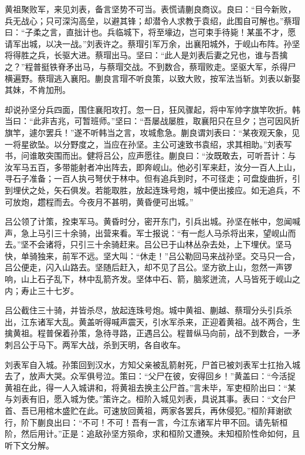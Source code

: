 黄祖聚败军，来见刘表，备言坚势不可当。表慌请蒯良商议。良曰：“目今新败，兵无战心；只可深沟高垒，以避其锋；却潜令人求教于袁绍，此围自可解也。”蔡瑁曰：“子柔之言，直拙计也。兵临城下，将至壕边，岂可束手待毙！某虽不才，愿请军出城，以决一战。”刘表许之。蔡瑁引军万余，出襄阳城外，于岘山布阵。孙坚将得胜之兵，长驱大进。蔡瑁出马。坚曰：“此人是刘表后妻之兄也，谁与吾擒之？”程普挺铁脊矛出马，与蔡瑁交战。不到数合，蔡瑁败走。坚驱大军，杀得尸横遍野。蔡瑁逃入襄阳。蒯良言瑁不听良策，以致大败，按军法当斩。刘表以新娶其妹，不肯加刑。

却说孙坚分兵四面，围住襄阳攻打。忽一日，狂风骤起，将中军帅字旗竿吹折。韩当曰：“此非吉兆，可暂班师。”坚曰：“吾屡战屡胜，取襄阳只在旦夕；岂可因风折旗竿，遽尔罢兵！”遂不听韩当之言，攻城愈急。蒯良谓刘表曰：“某夜观天象，见一将星欲坠。以分野度之，当应在孙坚。主公可速致书袁绍，求其相助。”刘表写书，问谁敢突围而出。健将吕公，应声愿往。蒯良曰：“汝既敢去，可听吾计：与汝军马五百，多带能射者冲出阵去，即奔岘山。他必引军来赶，汝分一百人上山，寻石子准备；一百人执弓弩伏于林中。但有追兵到时，不可径走；可盘旋曲折，引到埋伏之处，矢石俱发。若能取胜，放起连珠号炮，城中便出接应。如无追兵，不可放炮，趱程而去。今夜月不甚明，黄昏便可出城。”

吕公领了计策，拴束军马。黄昏时分，密开东门，引兵出城。孙坚在帐中，忽闻喊声，急上马引三十余骑，出营来看。军士报说：“有一彪人马杀将出来，望岘山而去。”坚不会诸将，只引三十余骑赶来。吕公已于山林丛杂去处，上下埋伏。坚马快，单骑独来，前军不远。坚大叫：“休走！”吕公勒回马来战孙坚。交马只一合，吕公便走，闪入山路去。坚随后赶入，却不见了吕公。坚方欲上山，忽然一声锣响，山上石子乱下，林中乱箭齐发。坚体中石、箭，脑浆迸流，人马皆死于岘山之内；寿止三十七岁。

吕公截住三十骑，并皆杀尽，放起连珠号炮。城中黄祖、蒯越、蔡瑁分头引兵杀出，江东诸军大乱。黄盖听得喊声震天，引水军杀来，正迎着黄祖。战不两合，生擒黄祖。程普保着孙策，急待寻路，正遇吕公。程普纵马向前，战不到数合，一矛刺吕公于马下。两军大战，杀到天明，各自收车。

刘表军自入城。孙策回到汉水，方知父亲被乱箭射死，尸首已被刘表军士扛抬入城去了，放声大哭。众军俱号泣。策曰：“父尸在彼，安得回乡！”黄盖曰：“今活捉黄祖在此，得一人入城讲和，将黄祖去换主公尸首。”言未毕，军吏桓阶出曰：“某与刘表有旧，愿入城为使。”策许之。桓阶入城见刘表，具说其事。表曰：“文台尸首、吾已用棺木盛贮在此。可速放回黄祖，两家各罢兵，再休侵犯。”桓阶拜谢欲行，阶下蒯良出曰：“不可！不可！吾有一言，今江东诸军片甲不回。请先斩桓阶，然后用计。”正是：追敌孙坚方殒命，求和桓阶又遭殃。未知桓阶性命如何，且听下文分解。